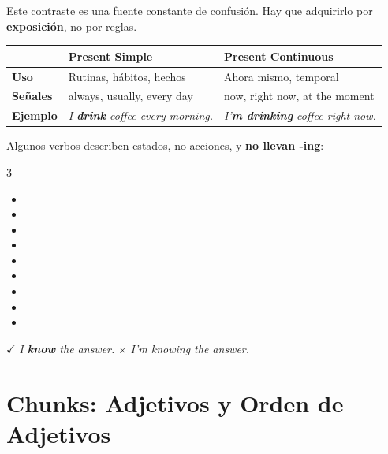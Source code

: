 \documentclass[12pt,a4paper]{article}
\begin{document}
\begin{cajagrammar}
Este contraste es una fuente constante de confusión. Hay que adquirirlo por \textbf{exposición}, no por reglas.

\medskip
\begin{tabularx}{\textwidth}{@{} l X X @{}}
\toprule
& \textbf{Present Simple} & \textbf{Present Continuous} \\
\midrule
\textbf{Uso} & Rutinas, hábitos, hechos & Ahora mismo, temporal \\
\textbf{Señales} & always, usually, every day & now, right now, at the moment \\
\textbf{Ejemplo} & \textit{I \textbf{drink} coffee every morning.} & \textit{I'\textbf{m drinking} coffee right now.} \\
\bottomrule
\end{tabularx}

\medskip
\begin{cajaejemplo}
Algunos verbos describen estados, no acciones, y \textbf{no llevan -ing}:
\begin{multicols}{3}
\begin{itemize}[nosep, leftmargin=0.5cm]
  \item {} 
  \item {} 
  \item {} 
  \item {} 
  \item {} 
  \item {} 
  \item {} 
  \item {} 
  \item {} 
\end{itemize}
\end{multicols}
$\checkmark$ \textit{I \textbf{know} the answer.} \quad $\times$ \textit{I'm knowing the answer.}
\end{cajaejemplo}
\end{cajagrammar}

\section{Chunks: Adjetivos y Orden de Adjetivos}
\end{document}
